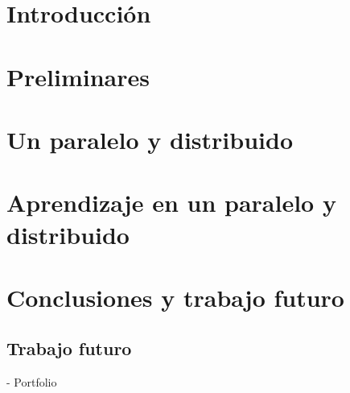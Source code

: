 \documentclass[a4paper, 11pt, twoside]{tesis}
\begin{document}
\chapter{Introducción}




\chapter{Preliminares}



\chapter{Un \ssolver paralelo y distribuido }

\chapter{Aprendizaje en un \ssolver paralelo y distribuido}

\chapter{Conclusiones y trabajo futuro}

\section{Trabajo futuro}
- Portfolio

{}

\end{document}
